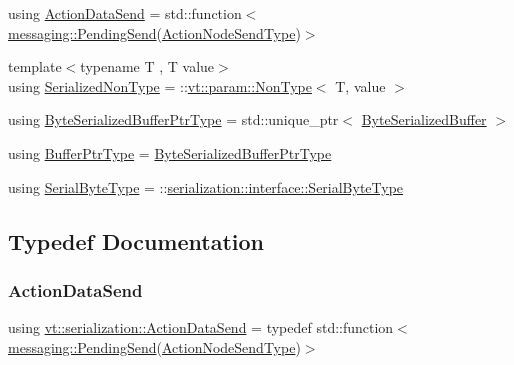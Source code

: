 \begin{DoxyCompactItemize}
\item 
using \hyperlink{namespacevt_1_1serialization_afffcac0da80b78e77ef8043dba4e814f}{Action\+Data\+Send} = std\+::function$<$ \hyperlink{structvt_1_1messaging_1_1_pending_send}{messaging\+::\+Pending\+Send}(\hyperlink{namespacevt_1_1serialization_ad4f189ca4817d31b73436c92bca55deb}{Action\+Node\+Send\+Type})$>$
\item 
{\footnotesize template$<$typename T , T value$>$ }\\using \hyperlink{namespacevt_1_1serialization_a834e21f3294a160fc6545a1bfc3044af}{Serialized\+Non\+Type} = \+::\hyperlink{structvt_1_1param_1_1_non_type}{vt\+::param\+::\+Non\+Type}$<$ T, value $>$
\item 
using \hyperlink{namespacevt_1_1serialization_a8f2372c7f89aee28287323667fac2cf5}{Byte\+Serialized\+Buffer\+Ptr\+Type} = std\+::unique\+\_\+ptr$<$ \hyperlink{structvt_1_1serialization_1_1_byte_serialized_buffer}{Byte\+Serialized\+Buffer} $>$
\item 
using \hyperlink{namespacevt_1_1serialization_a88fa9b491e54f71b1a16d8464e5fc0a9}{Buffer\+Ptr\+Type} = \hyperlink{namespacevt_1_1serialization_a8f2372c7f89aee28287323667fac2cf5}{Byte\+Serialized\+Buffer\+Ptr\+Type}
\item 
using \hyperlink{namespacevt_1_1serialization_a74f8d1a55940f9c38fc29522de66d926}{Serial\+Byte\+Type} = \+::\hyperlink{namespaceserialization_1_1interface_a718748616a908c35e6080b71d7790a76}{serialization\+::interface\+::\+Serial\+Byte\+Type}
\end{DoxyCompactItemize}


\subsection{Typedef Documentation}
\mbox{\label{namespacevt_1_1serialization_afffcac0da80b78e77ef8043dba4e814f}} 
\subsubsection{\texorpdfstring{Action\+Data\+Send}{ActionDataSend}}
{\footnotesize\ttfamily using \hyperlink{namespacevt_1_1serialization_afffcac0da80b78e77ef8043dba4e814f}{vt\+::serialization\+::\+Action\+Data\+Send} = typedef std\+::function$<$\hyperlink{structvt_1_1messaging_1_1_pending_send}{messaging\+::\+Pending\+Send}(\hyperlink{namespacevt_1_1serialization_ad4f189ca4817d31b73436c92bca55deb}{Action\+Node\+Send\+Type})$>$}


